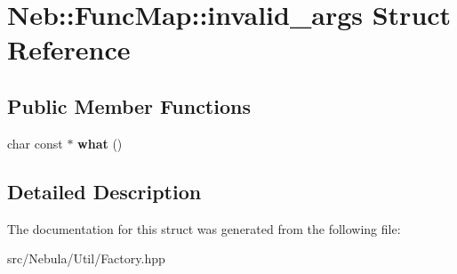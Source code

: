 \hypertarget{structNeb_1_1FuncMap_1_1invalid__args}{\section{\-Neb\-:\-:\-Func\-Map\-:\-:invalid\-\_\-args \-Struct \-Reference}
\label{structNeb_1_1FuncMap_1_1invalid__args}
}
\subsection*{\-Public \-Member \-Functions}
\begin{DoxyCompactItemize}
\item 
\hypertarget{structNeb_1_1FuncMap_1_1invalid__args_aac659f17828f0055c5a95701ee85cb2a}{char const $\ast$ {\bfseries what} ()}\label{structNeb_1_1FuncMap_1_1invalid__args_aac659f17828f0055c5a95701ee85cb2a}

\end{DoxyCompactItemize}


\subsection{\-Detailed \-Description}


\-The documentation for this struct was generated from the following file\-:\begin{DoxyCompactItemize}
\item 
src/\-Nebula/\-Util/\-Factory.\-hpp\end{DoxyCompactItemize}
